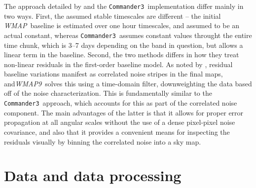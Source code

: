 \documentclass[twocolumn]{../../common/aa}
\def\WMAP{\emph{WMAP}}
\def\WMAPnine{\emph{WMAP9}}
\def\commanderthree{\texttt{Commander3}}
\begin{document}
The approach detailed by \citet{hinshaw2003a} and the
\commanderthree\ implementation differ mainly in two ways. First, the
assumed stable timescales are different -- the initial
\WMAP\ baseline is estimated over one hour timescales, and assumed to
be an actual constant, whereas \commanderthree\ assumes constant values
throught the entire time chunk, which is 3--7 days depending on the
band in question, but allows a linear term in the baseline. Second,
the two methods differs in how they treat non-linear residuals in the
first-order baseline model.  As noted by \citet{hinshaw2003a},
residual baseline variations manifest as correlated noise stripes in
the final maps, and\WMAPnine\ solves this using a time-domain filter,
downweighting the data based off of the noise characterization. This
is fundamentally similar to the \commanderthree\ approach, which
accounts for this as part of the correlated noise component. The main
advantages of the latter is that it allows for proper error
propagation at all angular scales without the use of a dense
pixel-pixel noise covariance, and also that it provides a convenient
means for inspecting the residuals visually by binning the correlated
noise into a sky map.

\section{Data and data processing}
\label{sec:data}
\end{document}
